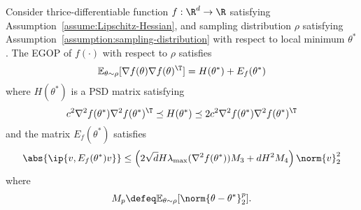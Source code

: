 \begin{lemma}\label{lem:EGOP-equation}
    Consider thrice-differentiable function $f:\R^d \rightarrow \R$ satisfying Assumption~\ref{assume:Lipschitz-Hessian}, and sampling distribution $\rho$ satisfying Assumption~\ref{assumption:sampling-distribution} with respect to local minimum $\theta^*$. The EGOP of $f(\cdot)$ with respect to $\rho$ satisfies
    \[
        \mathbb{E}_{\theta\sim \rho}[\nabla f(\theta)\nabla f(\theta)^\T] = H(\theta^*) + E_f(\theta^*)
    \]
    where $H(\theta^*)$ is a PSD matrix satisfying
    \[
        c^2 \nabla^2 f(\theta^*)\nabla^2 f(\theta^*)^\T \preceq H(\theta^*) \preceq 2c^2 \nabla^2 f(\theta^*)\nabla^2 f(\theta^*)^\T
    \]
    and the matrix $E_f(\theta^*)$ satisfies
    \[
    \abs{\ip{v, E_f (\theta^*) v}} \leq \left(2\sqrt{d}H \lambda_{\max}(\nabla^2 f(\theta^*)) M_3 + dH^2 M_4\right)\norm{v}^2_2
   \]
   where
   \[
    M_p \defeq \mathbb{E}_{\theta\sim\rho}[\norm{\theta-\theta^*}^{p}_2].
   \]
\end{lemma}


